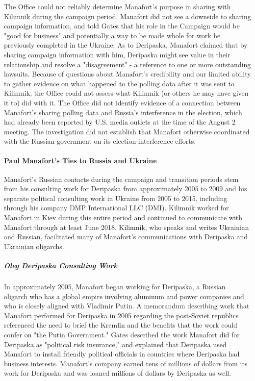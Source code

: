 The Office could not reliably determine Manafort's purpose in sharing with Kilimnik during the campaign period.
Manafort
did not see a downside to sharing campaign information, and told Gates that his role in the Campaign would be "good for business" and potentially a way to be made whole for work he previously completed in the Ukraine.
As to Deripaska, Manafort claimed that by sharing campaign information with him, Deripaska might see value in their relationship and resolve a "disagreement" - a reference to one or more outstanding lawsuits.
Because of questions about Manafort's credibility and our limited ability to gather evidence on what happened to the polling data after it was sent to Kilimnik, the Office could not assess what Kilimnik (or others he may have given it to) did with it.
The Office did not identify evidence of a connection between Manafort's sharing polling data and Russia's interference in the election, which had already been reported by U.S. media outlets at the time of the August 2 meeting.
The investigation did not establish that Manafort otherwise coordinated with the Russian government on its election-interference efforts.

\paragraph{Paul Manafort's Ties to Russia and Ukraine}

Manafort's Russian contacts during the campaign and transition periods stem from his consulting work for Deripaska from approximately 2005 to 2009 and his separate political consulting work in Ukraine from 2005 to 2015, including through his company DMP International LLC (DMI).
Kilimnik worked for Manafort in Kiev during this entire period and continued to communicate with Manafort through at least June 2018.
Kilimnik, who speaks and writes Ukrainian and Russian, facilitated many of Manafort's communications with Deripaska and Ukrainian oligarchs.

\subparagraph{Oleg Deripaska Consulting Work}

In approximately 2005, Manafort began working for Deripaska, a Russian oligarch who has a global empire involving aluminum and power companies and who is closely aligned with Vladimir Putin.%
A memorandum describing work that Manafort performed for Deripaska in 2005 regarding the post-Soviet republics referenced the need to brief the Kremlin and the benefits that the work could confer on "the Putin Government."%
Gates described the work Manafort did for Deripaska as "political risk insurance," and explained that Deripaska used Manafort to install friendly political officials in countries where Deripaska had business interests.%
Manafort's company earned tens of millions of dollars from its work for Deripaska and was loaned millions of dollars by Deripaska as well.%

